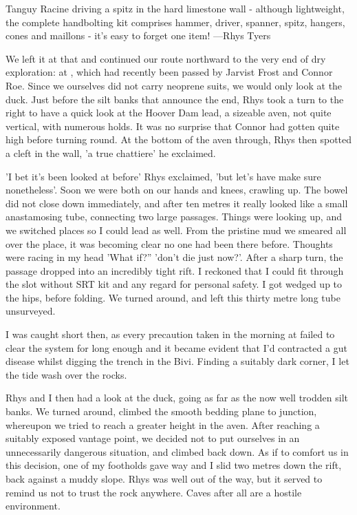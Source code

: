 \begin{marginfigure}
\checkoddpage \ifoddpage \forcerectofloat \else \forceversofloat \fi
\centering
 \caption{Tanguy Racine driving a spitz in the hard limestone wall - although lightweight, the complete handbolting kit comprises hammer, driver, spanner, spitz, hangers, cones and maillons - it's easy to forget one item! ---Rhys Tyers}
 \label{tanguy bolting}
\end{marginfigure}


We left it at that and continued our route northward to the very end of dry exploration: at , which had recently been passed by Jarvist Frost and Connor Roe. Since we ourselves did not carry neoprene suits, we would only look at the duck. Just before the silt banks that announce the end, Rhys took a turn to the right to have a quick look at the Hoover Dam lead, a sizeable aven, not quite vertical, with numerous holds. It was no surprise that Connor had gotten quite high before turning round. At the bottom of the aven through, Rhys then spotted a cleft in the wall, 'a true chattiere' he exclaimed.

'I bet it's been looked at before' Rhys exclaimed, 'but let's have make sure nonetheless'. Soon we were both on our hands and knees, crawling up. The bowel did not close down immediately, and after ten metres it really looked like a small anastamosing tube, connecting two large passages. Things were looking up, and we switched places so I could lead as well. From the pristine mud we smeared all over the place, it was becoming clear no one had been there before. Thoughts were racing in my head 'What if?'' 'don't die just now?'. After a sharp turn, the passage dropped into an incredibly tight rift. I reckoned that I could fit through the slot without SRT kit and any regard for personal safety. I got wedged up to the hips, before folding. We turned around, and left this thirty metre long tube unsurveyed. 

I was caught short then, as every precaution taken in the morning at  failed to clear the system for long enough and it became evident that I'd contracted a gut disease whilst digging the trench in the Bivi. Finding a suitably dark corner, I let the tide wash over the rocks. 

Rhys and I then had a look at the duck, going as far as the now well trodden silt banks. We turned around, climbed the smooth bedding plane to  junction, whereupon we tried to reach a greater height in the aven. After reaching a suitably exposed vantage point, we decided not to put ourselves in an unnecessarily dangerous situation, and climbed back down. As if to comfort us in this decision, one of my footholds gave way and I slid two metres down the rift, back against a muddy slope. Rhys was well out of the way, but it served to remind us not to trust the rock anywhere. Caves after all are a hostile environment. 

